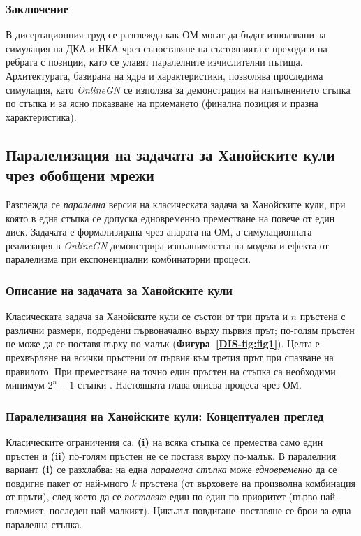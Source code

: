 \subsubsection{Заключение}

\hspace*{2.5em}В дисертационния труд се разглежда как ОМ могат да бъдат използвани за симулация на ДКА и НКА чрез съпоставяне на състоянията с преходи и на ребрата с позиции, като се улавят паралелните изчислителни пътища. Архитектурата, базирана на ядра и характеристики, позволява проследима симулация, като \textit{OnlineGN} се използва за демонстрация на изпълнението стъпка по стъпка и за ясно показване на приемането (финална позиция и празна характеристика).


\subsection{Паралелизация на задачата за Ханойските кули чрез обобщени мрежи}
\medskip
\hspace*{2.5em}Разглежда се \emph{паралелна} версия на класическата задача за Ханойските кули, при която в една стъпка се допуска едновременно преместване на повече от един диск. Задачата е формализирана чрез апарата на ОМ, а симулационната реализация в \textit{OnlineGN} демонстрира изпълнимостта на модела и ефекта от паралелизма при експоненциални комбинаторни процеси.

\subsubsection{Описание на задачата за Ханойските кули}
\hspace*{2.5em}Класическата задача за Ханойските кули \cite{DIS-wikipediaHanoi} се състои от три пръта и \(n\) пръстена с различни размери, подредени първоначално върху първия прът; по-голям пръстен не може да се поставя върху по-малък (\textbf{Фигура~\ref{DIS-fig:fig1}}). Целта е прехвърляне на всички пръстени от първия към третия прът при спазване на правилото. При преместване на точно един пръстен на стъпка са необходими минимум \(2^{n}-1\) стъпки \cite{DIS-frame1945,CLRS_TowerOfHanoi}. Настоящата глава описва процеса чрез ОМ.

\subsubsection{{Паралелизация на Ханойските кули: Концептуален преглед}\label{sec:parallel-concept}}
\hspace*{2.5em}Класическите ограничения са: \textbf{(i)} на всяка стъпка се премества само един пръстен и \textbf{(ii)} по-голям пръстен не се поставя върху по-малък. В паралелния вариант \textbf{(i)} се разхлабва: на една \emph{паралелна стъпка} може \emph{едновременно} да се повдигне пакет от най-много \(k\) пръстена (от върховете на произволна комбинация от пръти), след което да се \emph{поставят} един по един по приоритет (първо най-големият, последен най-малкият). Цикълът повдигане–поставяне се брои за една паралелна стъпка.

